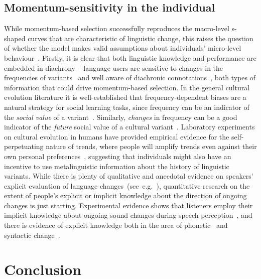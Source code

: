 \subsection{Momentum-sensitivity in the individual}

While momentum-based selection successfully reproduces the macro-level s-shaped curves that are characteristic of linguistic change, this raises the question of whether the model makes valid assumptions about individuals' micro-level behaviour~\citep{Mesoudi2009}. Firstly, it is clear that both linguistic knowledge and performance are embedded in diachrony -- language users are sensitive to changes in the frequencies of variants~\citep{Jaeger2013} and well aware of diachronic connotations~\citep{Labov2001,Guy2003,Tagliamonte2012}, %
both types of information that could drive momentum-based selection. In the general cultural evolution literature it is well-established that frequency-dependent biases are a natural strategy for social learning tasks, since frequency can be an indicator of the \emph{social value} of a variant~\citep{Boyd1985}. Similarly, \emph{changes} in frequency can be a good indicator of the \emph{future} social value of a cultural variant~\citep{Gureckis2009}. Laboratory experiments on cultural evolution in humans have provided empirical evidence for the self-perpetuating nature of trends, where people will amplify trends even against their own personal preferences~\citep{Salganik2008,Willer2009}, suggesting that individuals might also have an incentive to use metalinguistic information about the history of linguistic variants. While there is plenty of qualitative and anecdotal evidence on speakers' explicit evaluation of language changes~(see~e.g.~\citealt{Trudgill1972,Labov2001,Guy2003,Tagliamonte2012}), quantitative research on the extent of people's explicit or implicit knowledge about the direction of ongoing changes is just starting. Experimental evidence shows that listeners employ their implicit knowledge about ongoing sound changes during speech perception~\citep{Hay2006,Drager2011}, and there is evidence of explicit knowledge both in the area of phonetic~\citep{Carrera-Sabate2014} and syntactic change~\citep{Stadler2016Evolang}. %


\section{Conclusion}


